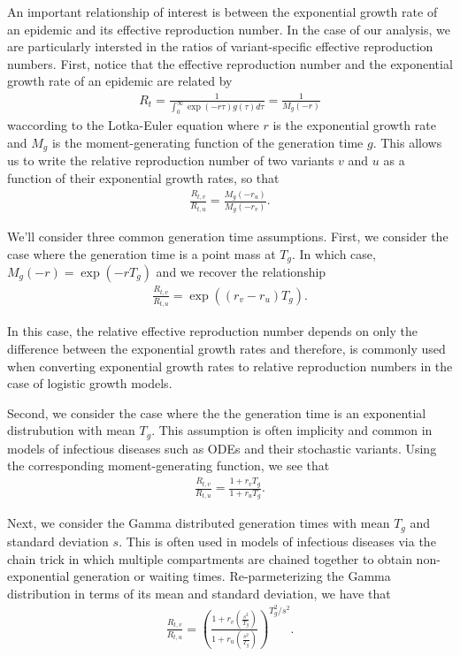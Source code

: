 \documentclass[11pt,oneside,letterpaper]{article}
\begin{document}
An important relationship of interest is between the exponential growth rate of an epidemic and its effective reproduction number. In the case of our analysis, we are particularly intersted in the ratios of variant-specific effective reproduction numbers. First, notice that the effective reproduction number and the exponential growth rate of an epidemic are related by
\begin{align*}
R_{t} = \frac{1}{\int_{0}^{\infty} \exp(-r\tau)g(\tau)d\tau} = \frac{1}{M_{g}(-r)}
\end{align*}
waccording to the Lotka-Euler equation \cite{Wallinga2006} where $r$ is the exponential growth rate and $M_{g}$ is the moment-generating function of the generation time $g$. 
This allows us to write the relative reproduction number of two variants $v$ and $u$ as a function of their exponential growth rates, so that
\begin{align*}
\frac{R_{t,v}}{R_{t,u}} = \frac{M_{g}(-r_{u})}{M_{g}(-r_{v})}.
\end{align*}

We'll consider three common generation time assumptions. First, we consider the case where the generation time is a point mass at $T_{g}$. In which case, $M_{g}(-r) = \exp(-r T_{g})$ and we recover the relationship
\begin{align*}
\frac{R_{t,v}}{R_{t,u}} = \exp( (r_{v}-r_{u})T_{g}).
\end{align*}

In this case, the relative effective reproduction number depends on only the difference between the exponential growth rates and therefore, is commonly used when converting exponential growth rates to relative reproduction numbers in the case of logistic growth models.

Second, we consider the case where the the generation time is an exponential distrubution with mean $T_{g}$. This assumption is often implicity and common in models of infectious diseases such as ODEs and their stochastic variants. Using the corresponding moment-generating function, we see that
\begin{align*}
\frac{R_{t,v}}{R_{t,u}} = \frac{1 + r_{v} T_{g}}{1 + r_{u} T_{g}}.
\end{align*}


Next, we consider the Gamma distributed generation times with mean $T_{g}$ and standard deviation $s$. This is often used in models of infectious diseases via the chain trick in which multiple compartments are chained together to obtain non-exponential generation or waiting times. Re-parmeterizing the Gamma distribution in terms of its mean and standard deviation, we have that
\begin{align*}
\frac{R_{t,v}}{R_{t,u}} = \left( \frac{1 + r_{v}  \left(\frac{s^{2}}{T_{g}}\right)}{1 + r_{u} \left(\frac{s^{2}}{T_{g}}\right) } \right)^{T_{g}^{2} / s^{2}}.
\end{align*}
\end{document}
